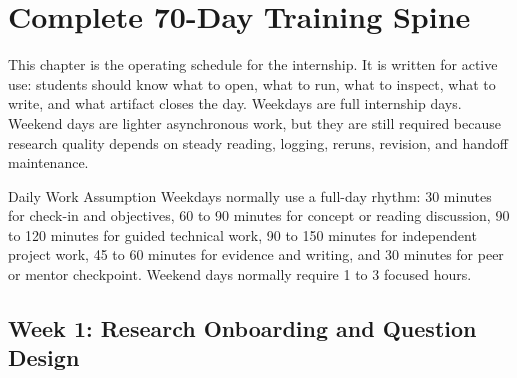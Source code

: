 \chapter{Complete 70-Day Training Spine}

This chapter is the operating schedule for the internship. It is written for active use: students should know what to open, what to run, what to inspect, what to write, and what artifact closes the day. Weekdays are full internship days. Weekend days are lighter asynchronous work, but they are still required because research quality depends on steady reading, logging, reruns, revision, and handoff maintenance.

\begin{programbox}{Daily Work Assumption}
Weekdays normally use a full-day rhythm: 30 minutes for check-in and objectives, 60 to 90 minutes for concept or reading discussion, 90 to 120 minutes for guided technical work, 90 to 150 minutes for independent project work, 45 to 60 minutes for evidence and writing, and 30 minutes for peer or mentor checkpoint. Weekend days normally require 1 to 3 focused hours.
\end{programbox}

\section{Week 1: Research Onboarding and Question Design}

